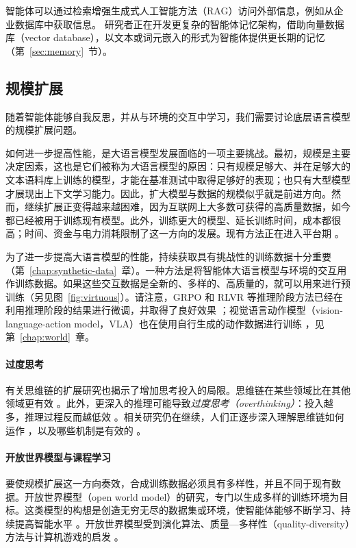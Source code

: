 智能体可以通过检索增强生成式人工智能方法（RAG）访问外部信息，例如从企业数据库中获取信息。
研究者正在开发更复杂的智能体记忆架构，借助向量数据库（vector database），以文本或词元嵌入的形式为智能体提供更长期的记忆（第~\ref{sec:memory}~节）。

\subsection{规模扩展}
随着智能体能够自我反思，并从与环境的交互中学习，我们需要讨论底层语言模型的规模扩展问题。

如何进一步提高性能，是大语言模型发展面临的一项主要挑战。最初，规模是主要决定因素，这也是它们被称为{\em 大}语言模型的原因：只有规模足够大、并在足够大的文本语料库上训练的模型，才能在基准测试中取得足够好的表现；也只有大型模型才展现出上下文学习能力。因此，扩大模型与数据的规模似乎就是前进方向。然而，继续扩展正变得越来越困难，因为互联网上大多数可获得的高质量数据，如今都已经被用于训练现有模型。此外，训练更大的模型、延长训练时间，成本都很高；时间、资金与电力消耗限制了这一方向的发展。现有方法正在进入平台期 \citep{sutskever2024}。

为了进一步提高大语言模型的性能，持续获取具有挑战性的训练数据十分重要（第~\ref{chap:synthetic-data}~章）。一种方法是将智能体大语言模型与环境的交互用作训练数据。如果这些交互数据是全新的、多样的、高质量的，就可以用来进行预训练（另见图~\ref{fig:virtuous}）。请注意，GRPO 和 RLVR 等推理阶段方法已经在利用推理阶段的结果进行微调，并取得了良好效果 \citep{guo2025deepseek}；视觉语言动作模型（vision-language-action model，VLA）也在使用自行生成的动作数据进行训练 \citep{black2024pi_0,brohan2023rt}，见第~\ref{chap:world}~章。

\paragraph{过度思考}
有关思维链的扩展研究也揭示了增加思考投入的局限。思维链在某些领域比在其他领域更有效 \citep{sprague2024cot}。此外，更深入的推理可能导致{\em 过度思考（overthinking）}：投入越多，推理过程反而越低效 \citep{liu2024mind,wu2025more}。相关研究仍在继续，人们正逐步深入理解思维链如何运作 \citep{chen2025does}，以及哪些机制是有效的 \citep{chen2026think}。

\paragraph{开放世界模型与课程学习}
要使规模扩展这一方向奏效，合成训练数据必须具有多样性，并且不同于现有数据。开放世界模型（open world model）的研究，专门以生成多样的训练环境为目标。这类模型的构想是创造无穷无尽的数据集或环境，使智能体能够不断学习、持续提高智能水平 \citep{bruce2024genie}。开放世界模型受到演化算法、质量—多样性（quality-diversity）方法与计算机游戏的启发 \citep{vinyals2019grandmaster,mouret2015illuminating,meta2022human}。

